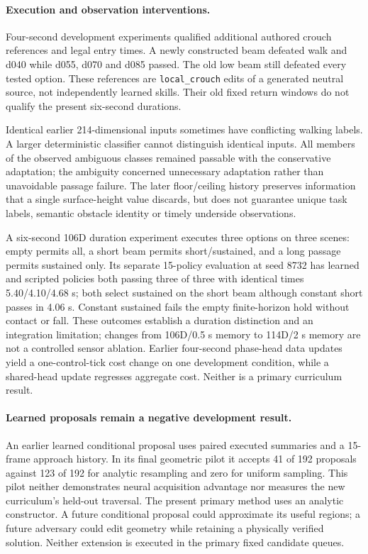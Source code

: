 \paragraph{Execution and observation interventions.}
Four-second development experiments qualified additional authored crouch
references and legal entry times. A newly constructed beam defeated walk and d040
while d055, d070 and d085 passed. The old low beam still defeated every tested
option. These references are \texttt{local\_crouch} edits of a generated neutral
source, not independently learned skills. Their old fixed return windows do not
qualify the present six-second durations.

Identical earlier 214-dimensional inputs sometimes have conflicting walking
labels. A larger deterministic classifier cannot distinguish identical inputs.
All members of the observed ambiguous classes remained passable with the
conservative adaptation; the ambiguity concerned unnecessary adaptation rather
than unavoidable passage failure. The later floor/ceiling history preserves
information that a single surface-height value discards, but does not guarantee
unique task labels, semantic obstacle identity or timely underside observations.

A six-second 106D duration experiment executes three options on three scenes:
empty permits all, a short beam permits short/sustained, and a long passage permits
sustained only. Its separate 15-policy evaluation at seed 8732 has learned and
scripted policies both passing three of three with identical times 5.40/4.10/4.68 s;
both select sustained on the short beam although constant short passes in 4.06 s.
Constant sustained fails the empty finite-horizon hold without contact or fall.
These outcomes establish a duration distinction and an integration limitation;
changes from 106D/0.5 s memory to 114D/2 s memory are not a controlled sensor
ablation. Earlier four-second phase-head data updates yield a one-control-tick
cost change on one development condition, while a shared-head update regresses
aggregate cost. Neither is a primary curriculum result.

\paragraph{Learned proposals remain a negative development result.}
An earlier learned conditional proposal uses paired executed summaries and a
15-frame approach history. In its final geometric pilot it accepts 41 of 192
proposals against 123 of 192 for analytic resampling and zero for uniform sampling.
This pilot neither demonstrates neural acquisition advantage nor measures the
new curriculum's held-out traversal. The present primary method uses an analytic
constructor. A future conditional proposal could approximate its useful regions;
a future adversary could edit geometry while retaining a physically verified
solution. Neither extension is executed in the primary fixed candidate queues.

